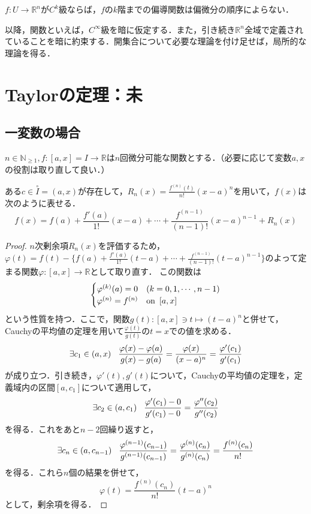 \documentclass[uplatex, dvipdfmx]{jsreport}
\begin{document}
\begin{theorem}\label{thm-exchange-of-partial-derivative}
    $f:U\to\mathbb{R}^n$が$C^k$級ならば，$f$の$k$階までの偏導関数は偏微分の順序によらない．
\end{theorem}

以降，関数といえば，$C^\infty$級を暗に仮定する．また，引き続き$\mathbb{R}^n$全域で定義されていることを暗に約束する．開集合について必要な理論を付け足せば，局所的な理論を得る．

\section{Taylorの定理：未}

\subsection{一変数の場合}

\begin{proposition}
    $n\in\mathbb{N}_{\ge 1}, f:[a,x]=I\to\mathbb{R}$は$n$回微分可能な関数とする．（必要に応じて変数$a,x$の役割は取り直して良い．）

    ある$c\in\overset{\circ}{I}=(a,x)$が存在して，$R_n(x)=\frac{f^{(n)}(t)}{n!}(x-a)^n$を用いて，$f(x)$は次のように表せる．
    \[ f(x) = f(a)+\frac{f'(a)}{1!}(x-a)+\cdots +\frac{f^{(n-1)}}{(n-1)!}(x-a)^{n-1}+R_n(x) \]
\end{proposition}
\begin{proof}
    $n$次剰余項$R_n(x)$を評価するため，$\varphi(t)=f(t)-\{ f(a)+\frac{f'(a)}{1!}(t-a)+\cdots +\frac{f^{(n-1)}}{(n-1)!}(t-a)^{n-1} \}$のよって定まる関数$\varphi:[a,x]\to\mathbb{R}$として取り直す．
    この関数は\[\begin{cases}
        \varphi^{(k)}(a)=0 & (k=0,1,\cdots,n-1) \\
        \varphi^{(n)} = f^{(n)}& \mathrm{on}\hspace{0.5em}[a,x]
    \end{cases}\]という性質を持つ．ここで，関数$g(t):[a,x]\ni t\mapsto (t-a)^n$と併せて，Cauchyの平均値の定理を用いて$\frac{\varphi(t)}{g(t)}$の$t=x$での値を求める．
    \[ \exists c_1\in (a,x)\hspace{3mm} \frac{\varphi(x)-\varphi(a)}{g(x)-g(a)} = \frac{\varphi(x)}{(x-a)^n} = \frac{\varphi'(c_1)}{g'(c_1)} \]
    が成り立つ．引き続き，$\varphi'(t), g'(t)$について，Cauchyの平均値の定理を，定義域内の区間$[a,c_1]$について適用して，
    \[ \exists c_2\in (a,c_1)\hspace{3mm}\frac{\varphi'(c_1)-0}{g'(c_1)-0} = \frac{\varphi''(c_2)}{g''(c_2)} \]
    を得る．これをあと$n-2$回繰り返すと，
    \[\exists c_n\in (a,c_{n-1})\hspace{3mm}\frac{\varphi^{(n-1)}(c_{n-1})}{g^{(n-1)}(c_{n-1})} = \frac{\varphi^{(n)}(c_n)}{g^{(n)}(c_n)}=\frac{f^{(n)}(c_n)}{n!}\]
    を得る．これら$n$個の結果を併せて，
    \[\varphi(t)=\frac{f^{(n)}(c_n)}{n!}(t-a)^n\]
    として，剰余項を得る．
\end{proof}
\end{document}
